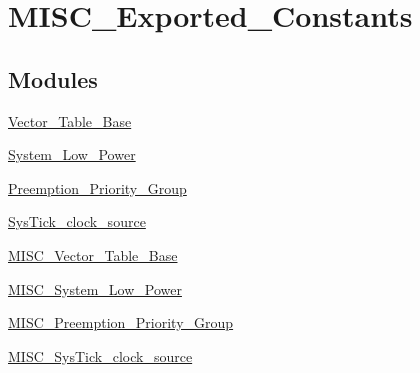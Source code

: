 \hypertarget{group___m_i_s_c___exported___constants}{\section{M\-I\-S\-C\-\_\-\-Exported\-\_\-\-Constants}
\label{group___m_i_s_c___exported___constants}
}
\subsection*{Modules}
\begin{DoxyCompactItemize}
\item 
\hyperlink{group___vector___table___base}{Vector\-\_\-\-Table\-\_\-\-Base}
\item 
\hyperlink{group___system___low___power}{System\-\_\-\-Low\-\_\-\-Power}
\item 
\hyperlink{group___preemption___priority___group}{Preemption\-\_\-\-Priority\-\_\-\-Group}
\item 
\hyperlink{group___sys_tick__clock__source}{Sys\-Tick\-\_\-clock\-\_\-source}
\item 
\hyperlink{group___m_i_s_c___vector___table___base}{M\-I\-S\-C\-\_\-\-Vector\-\_\-\-Table\-\_\-\-Base}
\item 
\hyperlink{group___m_i_s_c___system___low___power}{M\-I\-S\-C\-\_\-\-System\-\_\-\-Low\-\_\-\-Power}
\item 
\hyperlink{group___m_i_s_c___preemption___priority___group}{M\-I\-S\-C\-\_\-\-Preemption\-\_\-\-Priority\-\_\-\-Group}
\item 
\hyperlink{group___m_i_s_c___sys_tick__clock__source}{M\-I\-S\-C\-\_\-\-Sys\-Tick\-\_\-clock\-\_\-source}
\end{DoxyCompactItemize}


